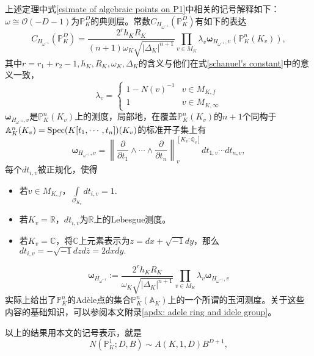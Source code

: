\begin{remark}
上述定理中式\eqref{esimate of algebraic points on P1}中相关的记号解释如下：$\omega\cong \mathcal{O}(-D-1)$为$\mathbb{P}_K^D$的典则层。常数$C_{H_{\omega^{-1}}}(\mathbb{P}_K^D)$有如下的表达
\begin{equation}
C_{H_{\omega^{-1}}}(\mathbb{P}_K^D) = \dfrac{2^r h_KR_K}{(n+1) \omega_K \sqrt{|\Delta_K|^{n+1}}} \prod\limits_{v\in M_K} \lambda_v \boldsymbol{\omega}_{H_{\omega^{-1}},v}(\mathbb{P}_K^n(K_v)),
\end{equation}
其中$r = r_1 + r_2 -1, h_K, R_K, \omega_K, \Delta_K$的含义与他们在式\eqref{schanuel's constant}中的意义一致，
\begin{equation}
\lambda_v = \begin{cases} 1 - N(v)^{-1} & v\in M_{K,f} \\ 1 & v \in M_{K,\infty} \end{cases}
\end{equation}
$\boldsymbol{\omega}_{H_{\omega^{-1}},v}$是$\mathbb{P}_K^n(K_v)$上的测度，局部地，在覆盖$\mathbb{P}_K^n(K_v)$的$n+1$个同构于$\mathbb{A}_K^n(K_v) = \operatorname{Spec}(K[t_1,\cdots,t_n])(K_v)$的标准开子集上有
\begin{equation}
\boldsymbol{\omega}_{H_{\omega^{-1}},v} = \left\| \dfrac{\partial}{\partial t_1} \wedge\cdots\wedge \dfrac{\partial}{\partial t_n} \right\|_v^{[K_v:\mathbb{Q}_v]} dt_{1,v}\cdots dt_{n,v},
\end{equation}
每个$dt_{i,v}$被正规化，使得
\begin{itemize}
\item 若$v\in M_{K,f}$，$\int\limits_{\mathcal{O}_{K_v}} dt_{i,v} = 1.$
\item 若$K_v = \mathbb{R}$，$dt_{i,v}$为$\mathbb{R}$上的Lebesgue测度。
\item 若$K_v = \mathbb{C}$，将$\mathbb{C}$上元素表示为$z = dx + \sqrt{-1}dy$，那么$dt_{i,v} = -\sqrt{-1}dzd\overline{z} = 2dxdy.$
\end{itemize}
\begin{equation}
\boldsymbol{\omega}_{H_{\omega^{-1}}} := \dfrac{2^r h_KR_K}{\omega_K \sqrt{|\Delta_K|^{n+1}}} \prod\limits_{v\in M_K} \lambda_v \boldsymbol{\omega}_{H_{\omega^{-1}},v}
\end{equation}
实际上给出了$\mathbb{P}_K^n$的Ad\`{e}le点的集合$\mathbb{P}_K^n(\mathbb{A}_K)$上的一个所谓的玉河测度。关于这些内容的基础知识，可以参阅本文附录\ref{apdx: adele ring and idele group}。

以上的结果用本文的记号表示，就是
\begin{equation}
N(\mathbb{P}^1_K;D,B) \sim A(K,1,D)B^{D+1},
\end{equation}
\end{remark}


